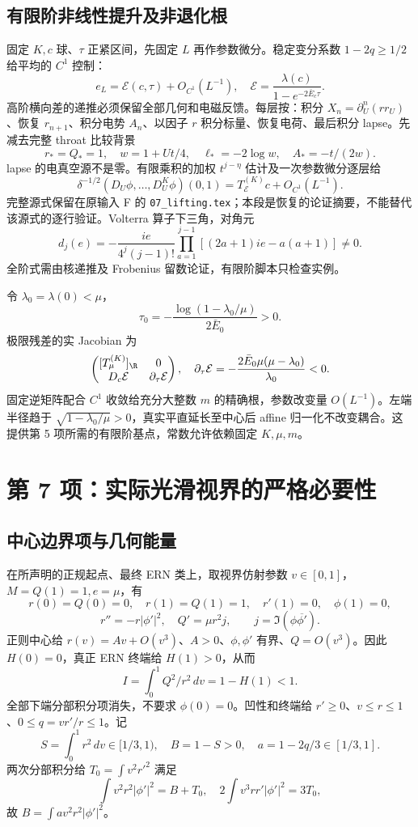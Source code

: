 \subsection{有限阶非线性提升及非退化根}
固定 $K,c$ 球、$\tau$ 正紧区间，先固定 $L$ 再作参数微分。稳定变分系数 $1-2q\ge1/2$ 给平均的 $C^1$ 控制：
\[
e_L=\mathcal E(c,\tau)+O_{C^1}(L^{-1}),\quad
\mathcal E=\frac{\lambda(c)}{1-e^{-2\bar E_c\tau}}.
\]
高阶横向差的递推必须保留全部几何和电磁反馈。每层按：积分 $X_n=\partial_U^n(rr_U)$、恢复 $r_{n+1}$、积分电势 $A_n$、以因子 $r$ 积分标量、恢复电荷、最后积分 lapse。先减去完整 throat 比较背景
\[
r_*=Q_*=1,\quad w=1+Ut/4,\quad
\ell_*=-2\log w,\quad A_*=-t/(2w).
\]
lapse 的电真空源不是零。有限乘积的加权 $t^{j-\eta}$ 估计及一次参数微分逐层给
\[
\delta^{-1/2}(D_U\phi,\ldots,D_U^K\phi)(0,1)
=T_{\mathcal E}^{(K)}c+O_{C^1}(L^{-1}).
\]
完整源式保留在原输入 F 的 \texttt{07\_lifting.tex}；本段是恢复的论证摘要，不能替代该源式的逐行验证。Volterra 算子下三角，对角元
\begin{equation}\label{eq:diag}
d_j(e)=-\frac{ie}{4^j(j-1)!}
\prod_{a=1}^{j-1}[(2a+1)ie-a(a+1)]\ne0.
\end{equation}
全阶式需由核递推及 Frobenius 留数论证，有限阶脚本只检查实例。

令 $\lambda_0=\lambda(0)<\mu$，
\[
\tau_0=-\frac{\log(1-\lambda_0/\mu)}{2\bar E_0}>0.
\]
极限残差的实 Jacobian 为
\[
\begin{pmatrix}[T_\mu^{(K)}]_{\R}&0\\D_c\mathcal E&\partial_\tau\mathcal E\end{pmatrix},
\quad\partial_\tau\mathcal E=-\frac{2\bar E_0\mu(\mu-\lambda_0)}{\lambda_0}<0.
\]
固定逆矩阵配合 $C^1$ 收敛给充分大整数 $m$ 的精确根，参数改变量 $O(L^{-1})$。左端半径趋于 $\sqrt{1-\lambda_0/\mu}>0$，真实平直延长至中心后 affine 归一化不改变耦合。这提供第 5 项所需的有限阶基点，常数允许依赖固定 $K,\mu,m$。

\section{第 7 项：实际光滑视界的严格必要性}
\subsection{中心边界项与几何能量}
在所声明的正规起点、最终 ERN 类上，取视界仿射参数 $v\in[0,1]$，$M=Q(1)=1,e=\mu$，有
\[
r(0)=Q(0)=0,\quad r(1)=Q(1)=1,\quad r'(1)=0,\quad\phi(1)=0,
\]
\[
r''=-r|\phi'|^2,\quad Q'=\mu r^2j,\qquad
j=\Im(\phi\overline{\phi'}).
\]
正则中心给 $r(v)=Av+O(v^3)$、$A>0$、$\phi,\phi'$ 有界、$Q=O(v^3)$。因此 $H(0)=0$，真正 ERN 终端给 $H(1)>0$，从而
\[
I=\int_0^1Q^2/r^2\,dv=1-H(1)<1.
\]
全部下端分部积分项消失，不要求 $\phi(0)=0$。凹性和终端给 $r'\ge0$、$v\le r\le1$、$0\le q=vr'/r\le1$。记
\[
S=\int_0^1r^2\,dv\in[1/3,1),\quad B=1-S>0,
\quad a=1-2q/3\in[1/3,1].
\]
两次分部积分给 $T_0=\int v^2r'^2$ 满足
\[
\int v^2r^2|\phi'|^2=B+T_0,\quad
2\int v^3rr'|\phi'|^2=3T_0,
\]
故 $B=\int av^2r^2|\phi'|^2$。

